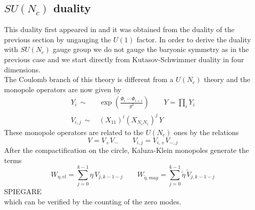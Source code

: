 \subsection{ $SU(N_c)$ duality }
\label{sec:reduction_kss_sun}
This duality first appeared in \cite{Park:2013wta} and it was obtained from the duality of the previous section by ungauging the $U(1)$ factor.
In order to derive the duality with $SU(N_c)$ gauge group we do not gauge the baryonic symmetry as in the previous case and we start directly from Kutasov-Schwimmer duality in four dimensions.
\\
The Coulomb branch of this theory is different from a $U(N_c)$ theory and the monopole operators are now given by \cite{Nii:2014jsa}
\begin{align}
Y_i \, \sim \, & \exp \left(   \frac{ \Phi_i - \Phi_{i+1}}{g^2}  \right) \qquad 
Y = \prod_i Y_i
\\
V_{i,j} \, \sim \, & (X_{11})^i (X_{N_c N_c})^j\, Y
\end{align}
These monopole operators are related to the $U(N_c)$ ones by the relations
\begin{equation}
 V = V_+ V_- \qquad V_{i,j} = V_{i,+} V_{-,j}
 \end{equation} 
After the compactification on the circle, Kaluza-Klein monopoles generate the terms \cite{Nii:2014jsa}
\begin{equation}
W_{\eta, el} = \sum_{j=0}^{k-1} \eta \, V_{j,k-1-j} \qquad W_{\tilde{\eta}, mag} = \sum_{j=0}^{k-1 } \tilde{\eta} \, \tilde{V}_{j,k-1-j} 
\end{equation}  
{\Large SPIEGARE}\\
which can be verified by the counting of the zero modes.\\




